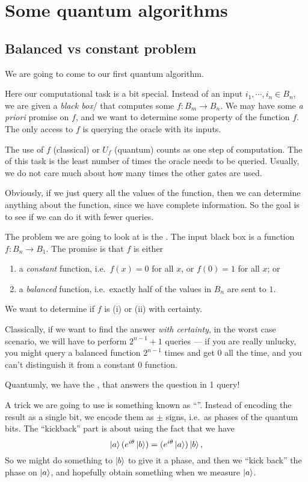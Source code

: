 \section{Some quantum algorithms}
\subsection{Balanced vs constant problem}
We are going to come to our first quantum algorithm.

Here our computational task is a bit special. Instead of an input $i_1, \cdots, i_n \in B_n$, we are given a \emph{black box}/ that computes some $f: B_m \to B_n$. We may have some \emph{a priori} promise on $f$, and we want to determine some property of the function $f$. The only access to $f$ is querying the oracle with its inputs.

The use of $f$ (classical) or $U_f$ (quantum) counts as one step of computation. The  of this task is the least number of times the oracle needs to be queried. Usually, we do not care much about how many times the other gates are used.

Obviously, if we just query all the values of the function, then we can determine anything about the function, since we have complete information. So the goal is to see if we can do it with fewer queries.

The problem we are going to look at is the . The input black box is a function $f: B_n \to B_1$. The promise is that $f$ is either
\begin{enumerate}
  \item a \emph{constant} function, i.e.\ $f(x) = 0$ for all $x$, or $f(0) = 1$ for all $x$; or
  \item a \emph{balanced} function, i.e.\ exactly half of the values in $B_n$ are sent to $1$.
\end{enumerate}
We want to determine if $f$ is (i) or (ii) with certainty.

Classically, if we want to find the answer \emph{with certainty}, in the worst case scenario, we will have to perform $2^{n - 1} + 1$ queries --- if you are really unlucky, you might query a balanced function $2^{n - 1}$ times and get $0$ all the time, and you can't distinguish it from a constant $0$ function.

Quantumly, we have the , that answers the question in 1 query!

A trick we are going to use is something known as ``''. Instead of encoding the result as a single bit, we encode them as $\pm$ signs, i.e.\ as phases of the quantum bits. The ``kickback'' part is about using the fact that we have
\[
  \left\lvert a\right\rangle (e^{i\theta}\left\lvert b\right\rangle) = (e^{i\theta}\left\lvert a\right\rangle)\left\lvert b\right\rangle,
\]
So we might do something to $\left\lvert b\right\rangle$ to give it a phase, and then we ``kick back'' the phase on $\left\lvert a\right\rangle$, and hopefully obtain something when we measure $\left\lvert a\right\rangle$.

